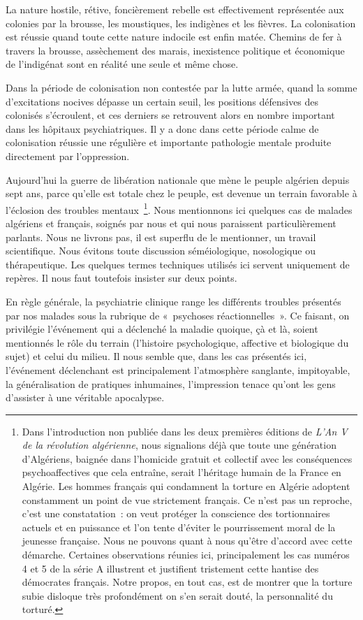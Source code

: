 \documentclass[french,twoside]{book} %
\begin{document}
La nature hostile, rétive, foncièrement rebelle est effectivement représentée aux colonies par la brousse, les moustiques, les indigènes et les fièvres. La colonisation est réussie quand toute cette nature indocile est enfin matée. Chemins de fer à travers la brousse, assèchement des marais, inexistence politique et économique de l’indigénat sont en réalité une seule et même chose.\par
Dans la période de colonisation non contestée par la lutte armée, quand la somme d’excitations nocives dépasse un certain seuil, les positions défensives des colonisés s’écroulent, et ces derniers se retrouvent alors en nombre important dans les hôpitaux psychiatriques. Il y a donc dans cette période calme de colonisation réussie une régulière et importante pathologie mentale produite directement par l’oppression.\par
Aujourd’hui la guerre de libération nationale que mène le peuple algérien depuis sept ans, parce qu’elle est totale chez le peuple, est devenue un terrain favorable à l’éclosion des troubles   mentaux \footnote{Dans l’introduction non publiée dans les deux premières éditions de \emph{L’An V de la révolution algérienne}, nous signalions déjà que toute une génération d’Algériens, baignée dans l’homicide gratuit et collectif avec les conséquences psychoaffectives que cela entraîne, serait l’héritage humain de la France en Algérie. Les hommes français qui condamnent la torture en Algérie adoptent constamment un point de vue strictement français. Ce n’est pas un reproche, c’est une constatation : on veut protéger la conscience des tortionnaires actuels et en puissance et l’on tente d’éviter le pourrissement moral de la jeunesse française. Nous ne pouvons quant à nous qu’être d’accord avec cette démarche. Certaines observations réunies ici, principalement les cas numéros 4 et 5 de la série A illustrent et justifient tristement cette hantise des démocrates français. Notre propos, en tout cas, est de montrer que la torture subie disloque très profondément on s’en serait douté, la personnalité du torturé.}. Nous mentionnons ici quelques cas de malades algériens et français, soignés par nous et qui nous paraissent particulièrement parlants. Nous ne livrons pas, il est superflu de le mentionner, un travail scientifique. Nous évitons toute discussion séméiologique, nosologique ou thérapeutique. Les quelques termes techniques utilisés ici servent uniquement de repères. Il nous faut toutefois insister sur deux points.\par
En règle générale, la psychiatrie clinique range les différents troubles présentés par nos malades sous la rubrique de « psychoses réactionnelles ». Ce faisant, on privilégie l’événement qui a déclenché la maladie quoique, çà et là, soient mentionnés le rôle du terrain (l’histoire psychologique, affective et biologique du sujet) et celui du milieu. Il nous semble que, dans les cas présentés ici, l’événement déclenchant est principalement l’atmosphère sanglante, impitoyable, la généralisation de pratiques inhumaines, l’impression tenace qu’ont les gens d’assister à une véritable apocalypse.\par
\end{document}
